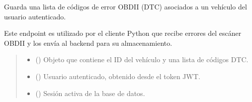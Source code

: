 \documentclass[letterpaper,10pt,spanish]{sphinxmanual}
\begin{document}

\begin{fulllineitems}
\label{\detokenize{modelos:main.guardar_errores}}
\pysigstartsignatures
\pysiglinewithargsret
{}
{\sphinxparamcomma {}\sphinxparamcomma {}}
{}
\pysigstopsignatures
\sphinxAtStartPar
Guarda una lista de códigos de error OBD\sphinxhyphen{}II (DTC) asociados a un vehículo del usuario autenticado.

\sphinxAtStartPar
Este endpoint es utilizado por el cliente Python que recibe errores del escáner OBD\sphinxhyphen{}II y los envía al backend para su almacenamiento.
\begin{quote}\begin{description}
\begin{itemize}
\item {} 
\sphinxAtStartPar
{} ({\hyperref[\detokenize{modelos:main.ErrorVehiculoRegistro}]{}}) \textendash{} Objeto que contiene el ID del vehículo y una lista de códigos DTC.

\item {} 
\sphinxAtStartPar
{} ({\hyperref[\detokenize{modelos:main.Usuario}]{}}) \textendash{} Usuario autenticado, obtenido desde el token JWT.

\item {} 
\sphinxAtStartPar
{} () \textendash{} Sesión activa de la base de datos.

\end{itemize}


\end{description}
\end{quote}
\end{fulllineitems}
\end{document}
